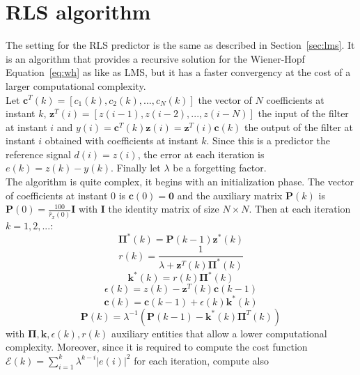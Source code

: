 \documentclass[10pt]{article}
\numberwithin{equation}{section}
\begin{document}
\section{RLS algorithm}
The setting for the RLS predictor is the same as described in Section~\ref{sec:lms}. It is an algorithm that provides a recursive solution for the Wiener-Hopf Equation~\ref{eq:wh} as like as LMS, but it has a faster convergency at the cost of a larger computational complexity. \\
Let $\mathbf{c}^T(k) = [c_1(k), c_2(k), ..., c_N(k)]$ the vector of $N$ coefficients at instant $k$, $\mathbf{z}^T(i) = [z(i-1), z(i-2), ..., z(i-N)]$ the input of the filter at instant $i$ and $y(i) = \mathbf{c}^T(k)\mathbf{z}(i) = \mathbf{z}^T(i)\mathbf{c}(k)$ the output of the filter at instant $i$ obtained with coefficients at instant $k$. Since this is a predictor the reference signal $d(i) = z(i)$, the error at each iteration is $e(k) = z(k) - y(k)$. Finally let $\lambda$ be a forgetting factor.\\
The algorithm is quite complex, it begins with an initialization phase. The vector of coefficients at instant $0$ is $\mathbf{c}(0) = \mathbf{0}$ and the auxiliary matrix $\mathbf{P}(k)$ is $\mathbf{P}(0) = \frac{100}{\hat{r}_x(0)} \mathbf{I}$ with $\mathbf{I}$ the identity matrix of size $N\times N$. Then at each iteration $k = 1, 2, ...$:
\begin{equation}
  \mathbf{\Pi}^*(k) = \mathbf{P}(k-1)\mathbf{z}^*(k)
\end{equation}
\begin{equation}
  r(k) = \frac{1}{\lambda + \mathbf{z}^T(k)\mathbf{\Pi}^*(k)}
\end{equation}
\begin{equation}
  \mathbf{k}^*(k) = r(k)\mathbf{\Pi}^*(k)
\end{equation}
\begin{equation}
  \epsilon(k) = z(k) - \mathbf{z}^T(k)\mathbf{c}(k-1)
\end{equation}
\begin{equation}
  \mathbf{c}(k) = \mathbf{c}(k-1) + \epsilon(k)\mathbf{k}^*(k)
\end{equation}
\begin{equation}
  \mathbf{P}(k) = \lambda^{-1}(\mathbf{P}(k-1) - \mathbf{k}^*(k)\mathbf{\Pi}^T(k))
\end{equation}
with $\mathbf{\Pi}, \mathbf{k}, \epsilon(k), r(k)$ auxiliary entities that allow a lower computational complexity. Moreover, since it is required to compute the cost function $\mathcal{E}(k) = \sum_{i=1}^k \lambda^{k-i} |e(i)|^2$ for each iteration, compute also
\end{document}
